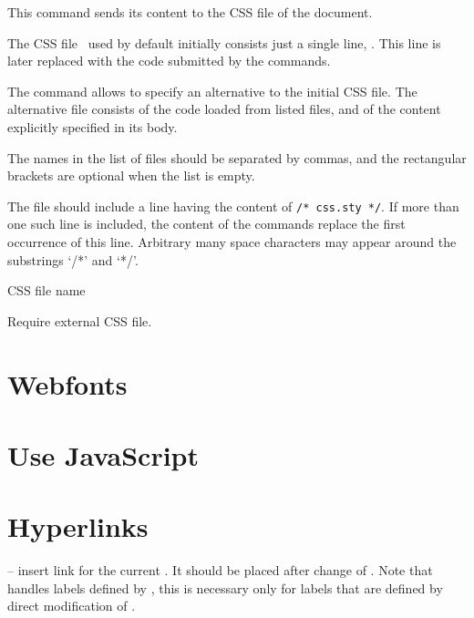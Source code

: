 \documentclass{book}
\begin{document}

This command sends its content to the CSS file of the document. 


The CSS file \texfourht\ used by default initially consists just
a single line,  . This line is later
replaced with the code submitted by the  commands.

The \texcommand{\CssFile} command allows to specify an alternative to the initial CSS file.
The alternative file consists of the code loaded from listed files, and of the
content explicitly specified in its body.


The names in the list of files should be separated by commas, and the rectangular brackets are optional when the list is empty.

The file should include a line having the content of \verb|/* css.sty */|. If
more than one such line is included, the content of the  commands
replace the first occurrence of this line. Arbitrary many space characters may
appear around the substrings ‘/*’ and ‘*/’. 

 {CSS file name}\EndDoc

Require external CSS file.

\section{Webfonts}

\section{Use JavaScript}
\section{Hyperlinks}

\texcommand{\AnchorLabel} -- insert link for the current \texcommand{\label}. It should be placed after change 
of \texcommand{\@currentlabel}. Note that \texfourht{} handles labels defined by ,
this is necessary only for labels that are defined by direct modification of \texcommand{\@currentlabel}.
\end{document}
